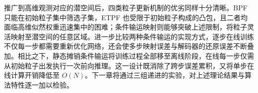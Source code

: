 推广到高维观测对应的潜空间后，四类粒子更新机制的优劣同样十分清晰。BPF 只能在初始粒子集中筛选子集，ETPF 也受限于初始粒子构成的凸包，且二者均面临高维似然权重迅速集中的困难；条件输运映射则能够突破上述限制，将粒子灵活映射至潜空间的任意区域。进一步比较两种条件输运的实现方式，逐步在线训练不仅每一步都需要重新优化网络，还会使多步映射误差与解码器的还原误差不断叠加。相比之下，静态摊销条件输运将训练过程全部移至离线阶段，在线每一步仅需从初始粒子出发执行一次前向推理。这一设计既消除了跨步误差累积，又将单步在线计算开销降低至 $O(N)$。下一章将通过三组递进的实验，对上述理论结果与算法特性逐一加以检验。
